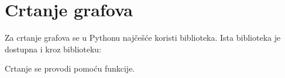 \section{Crtanje grafova}

Za crtanje grafova se u Pythonu najčešće koristi 
biblioteka. Ista biblioteka je dostupna i kroz  biblioteku:



Crtanje se provodi pomoću  funkcije.




